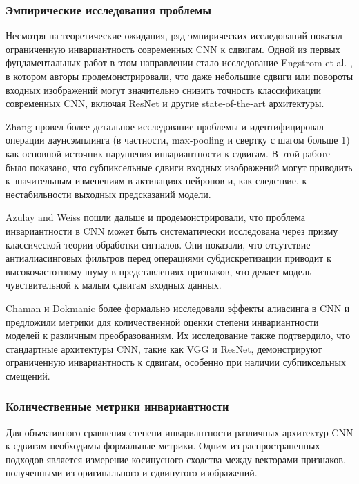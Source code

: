 \subsubsection{Эмпирические исследования проблемы}
\label{review:invariance:empirical}

Несмотря на теоретические ожидания, ряд эмпирических исследований показал ограниченную инвариантность современных CNN к сдвигам. Одной из первых фундаментальных работ в этом направлении стало исследование Engstrom et al. \cite{engstrom2019exploring}, в котором авторы продемонстрировали, что даже небольшие сдвиги или повороты входных изображений могут значительно снизить точность классификации современных CNN, включая ResNet и другие state-of-the-art архитектуры.

Zhang \cite{Zhang2019blurpool} провел более детальное исследование проблемы и идентифицировал операции даунсэмплинга (в частности, max-pooling и свертку с шагом больше 1) как основной источник нарушения инвариантности к сдвигам. В этой работе было показано, что субпиксельные сдвиги входных изображений могут приводить к значительным изменениям в активациях нейронов и, как следствие, к нестабильности выходных предсказаний модели.

Azulay and Weiss \cite{azulay2019deep} пошли дальше и продемонстрировали, что проблема инвариантности в CNN может быть систематически исследована через призму классической теории обработки сигналов. Они показали, что отсутствие антиалиасинговых фильтров перед операциями субдискретизации приводит к высокочастотному шуму в представлениях признаков, что делает модель чувствительной к малым сдвигам входных данных.

Chaman и Dokmanic \cite{chaman2021truly} более формально исследовали эффекты алиасинга в CNN и предложили метрики для количественной оценки степени инвариантности моделей к различным преобразованиям. Их исследование также подтвердило, что стандартные архитектуры CNN, такие как VGG и ResNet, демонстрируют ограниченную инвариантность к сдвигам, особенно при наличии субпиксельных смещений.

\subsubsection{Количественные метрики инвариантности}
\label{review:invariance:metrics}

Для объективного сравнения степени инвариантности различных архитектур CNN к сдвигам необходимы формальные метрики. Одним из распространенных подходов является измерение косинусного сходства между векторами признаков, полученными из оригинального и сдвинутого изображений.

